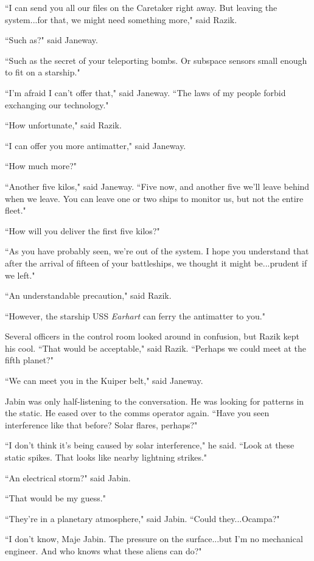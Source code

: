 \documentclass[twoside,letterpaper,12pt]{memoir}
\begin{document}
``I can send you all our files on the Caretaker right away. But leaving the system...for that, we might need something more," said Razik.

``Such as?" said Janeway.

``Such as the secret of your teleporting bombs. Or subspace sensors small enough to fit on a starship."

``I'm afraid I can't offer that," said Janeway. ``The laws of my people forbid exchanging our technology."

``How unfortunate," said Razik.

``I can offer you more antimatter," said Janeway.

``How much more?"

``Another five kilos," said Janeway. ``Five now, and another five we'll leave behind when we leave. You can leave one or two ships to monitor us, but not the entire fleet."

``How will you deliver the first five kilos?"

``As you have probably seen, we're out of the system. I hope you understand that after the arrival of fifteen of your battleships, we thought it might be...prudent if we left."

``An understandable precaution," said Razik.

``However, the starship USS \textit{Earhart} can ferry the antimatter to you."

Several officers in the control room looked around in confusion, but Razik kept his cool. ``That would be acceptable," said Razik. ``Perhaps we could meet at the fifth planet?"

``We can meet you in the Kuiper belt," said Janeway.

Jabin was only half-listening to the conversation. He was looking for patterns in the static. He eased over to the comms operator again. ``Have you seen interference like that before? Solar flares, perhaps?"

``I don't think it's being caused by solar interference," he said. ``Look at these static spikes. That looks like nearby lightning strikes."

``An electrical storm?" said Jabin.

``That would be my guess."

``They're in a planetary atmosphere," said Jabin. ``Could they...Ocampa?"

``I don't know, Maje Jabin. The pressure on the surface...but I'm no mechanical engineer. And who knows what these aliens can do?"
\end{document}
